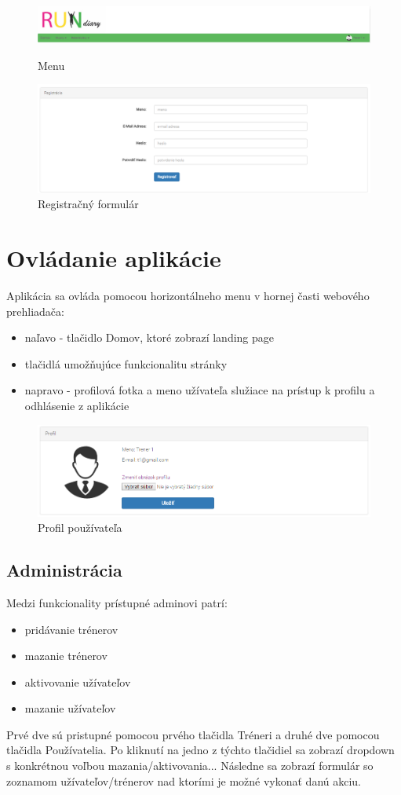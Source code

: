 \documentclass[12pt,a4paper]{report}
\theoremstyle{definition}
\theoremstyle{remark}
\begin{document}
\begin{figure}[ht!]
\centering
\includegraphics[width=\textwidth]{menu.png}
\caption{Menu \label{Menu}}
\includegraphics[width=\textwidth]{reg.png}
\caption{Registračný formulár \label{reg}}
\end{figure}

\section{Ovládanie aplikácie}
Aplikácia sa ovláda pomocou horizontálneho menu v hornej časti webového prehliadača:
\begin{itemize}
\item naľavo - tlačidlo Domov, ktoré zobrazí landing page
\item tlačidlá umožňujúce funkcionalitu stránky
\item napravo - profilová fotka a meno užívateľa služiace na prístup k profilu a odhlásenie z aplikácie
\end{itemize}

\begin{figure}[ht!]
\centering
\includegraphics[width=\textwidth]{profil.png}
\caption{Profil používateľa \label{profil}}
\end{figure}
\subsection{Administrácia}

Medzi funkcionality prístupné adminovi patrí:
\begin{itemize}
\item pridávanie trénerov
\item mazanie trénerov
\item aktivovanie užívateľov
\item mazanie užívateľov
\end{itemize}
Prvé dve sú pristupné pomocou prvého tlačidla Tréneri a druhé dve pomocou tlačidla Používatelia. Po kliknutí na jedno z týchto tlačidiel sa zobrazí dropdown s konkrétnou voľbou mazania/aktivovania... Následne sa zobrazí formulár so zoznamom užívateľov/trénerov nad ktorími je možné vykonať danú akciu.
\end{document}

